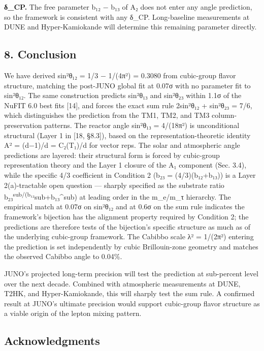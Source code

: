\documentclass[
  11pt,
  letterpaper,
]{article}
\begin{document}
\textbf{δ\_CP.} The free parameter b₁₂ − b₁₃ of A₂ does not enter any
angle prediction, so the framework is consistent with any δ\_CP.
Long-baseline measurements at DUNE and Hyper-Kamiokande will determine
this remaining parameter directly.

\hypertarget{conclusion}{%
\subsection{8. Conclusion}\label{conclusion}}

We have derived sin²θ₁₂ = 1/3 − 1/(4π²) = 0.3080 from cubic-group flavor
structure, matching the post-JUNO global fit at 0.07σ with no parameter
fit to sin²θ₁₂. The same construction predicts sin²θ₁₃ and sin²θ₂₃
within 1.1σ of the NuFIT 6.0 best fits {[}14{]}, and forces the exact
sum rule 2sin²θ₁₂ + sin²θ₂₃ = 7/6, which distinguishes the prediction
from the TM1, TM2, and TM3 column-preservation patterns. The reactor
angle sin²θ₁₃ = 4/(18π²) is unconditional structural (Layer 1 in {[}18,
§8.3{]}), based on the representation-theoretic identity A² = (d−1)/d =
C₂(T₁)/d for vector reps. The solar and atmospheric angle predictions
are layered: their structural form is forced by cubic-group
representation theory and the Layer 1 closure of the A₁ component (Sec.
3.4), while the specific 4/3 coefficient in Condition 2 (b₂₃ =
(4/3)(b₁₂+b₁₃)) is a Layer 2(a)-tractable open question --- sharply
specified as the substrate ratio
b₂₃\textsuperscript{sub/(b₁₂}sub+b₁₃\^{}sub) at leading order in the
m\_e/m\_τ hierarchy. The empirical match at 0.07σ on sin²θ₁₂ and at 0.6σ
on the sum rule indicates the framework's bijection has the alignment
property required by Condition 2; the predictions are therefore tests of
the bijection's specific structure as much as of the underlying
cubic-group framework. The Cabibbo scale λ² = 1/(2π²) entering the
prediction is set independently by cubic Brillouin-zone geometry and
matches the observed Cabibbo angle to 0.04\%.

JUNO's projected long-term precision will test the prediction at
sub-percent level over the next decade. Combined with atmospheric
measurements at DUNE, T2HK, and Hyper-Kamiokande, this will sharply test
the sum rule. A confirmed result at JUNO's ultimate precision would
support cubic-group flavor structure as a viable origin of the lepton
mixing pattern.

\hypertarget{acknowledgments}{%
\subsection{Acknowledgments}\label{acknowledgments}}
\end{document}
